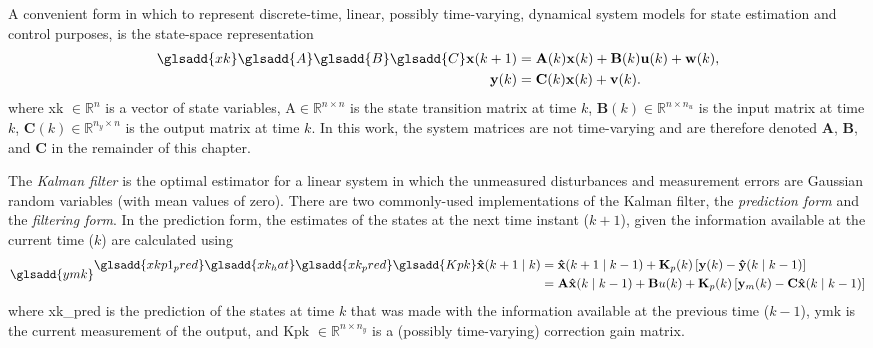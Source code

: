 A convenient form in which to represent discrete-time, linear, possibly time-varying, dynamical system models for state estimation and control purposes, is the state-space representation
\begin{equation} \label{eq:ss_rep_uwy}
	\begin{aligned} \glsadd{xk} \glsadd{A} \glsadd{B} \glsadd{C}
		\mathbf{x}(k+1) &= \mathbf{A}(k) \mathbf{x}(k) + \mathbf{B}(k) \mathbf{u}(k) + \mathbf{w}(k), \\
		\mathbf{y}(k) &= \mathbf{C}(k) \mathbf{x}(k) + \mathbf{v}(k).
	\end{aligned}
\end{equation}
where \gls{xk} $\in \mathbb{R}^n$ is a vector of state variables, \gls{A}$\in \mathbb{R}^{n \times n}$ is the state transition matrix at time $k$, $\mathbf{B}(k) \in \mathbb{R}^{n \times n_u}$ is the input matrix at time $k$, $\mathbf{C}(k) \in \mathbb{R}^{n_y \times n}$ is the output matrix at time $k$. In this work, the system matrices are not time-varying and are therefore denoted $\mathbf{A}$, $\mathbf{B}$, and $\mathbf{C}$ in the remainder of this chapter.

The \textit{Kalman filter} \citep{kalman_new_1961} is the optimal estimator for a linear system in which the unmeasured disturbances and measurement errors are Gaussian random variables (with mean values of zero). There are two commonly-used implementations of the Kalman filter, the \textit{prediction form} and the \textit{filtering form}. In the prediction form, the estimates of the states at the next time instant ($k+1$), given the information available at the current time ($k$) are calculated using
\begin{equation} \glsadd{ymk}
\begin{aligned} \label{eq:xkp1_hat_p} \glsadd{xkp1_pred} \glsadd{xk_hat} \glsadd{xk_pred} \glsadd{Kpk}
	\mathbf{\hat{x}}(k+1 \mid k) &= \mathbf{\hat{x}}(k+1 \mid k-1) + \mathbf{K}_p(k) \left[ \mathbf{y}(k) - \mathbf{\hat{y}}(k \mid k-1) \right] \\
	&= \mathbf{A}\mathbf{\hat{x}}(k \mid k-1) + \mathbf{B}u(k) + \mathbf{K}_p(k) \left[ \mathbf{y}_m(k) - \mathbf{C} \mathbf{\hat{x}}(k \mid k-1) \right]
\end{aligned}
\end{equation}
where \gls{xk_pred} is the prediction of the states at time $k$ that was made with the information available at the previous time ($k-1$), \gls{ymk} is the current measurement of the output, and \gls{Kpk} $\in \mathbb{R}^{n \times n_y}$ is a (possibly time-varying) correction gain matrix.

